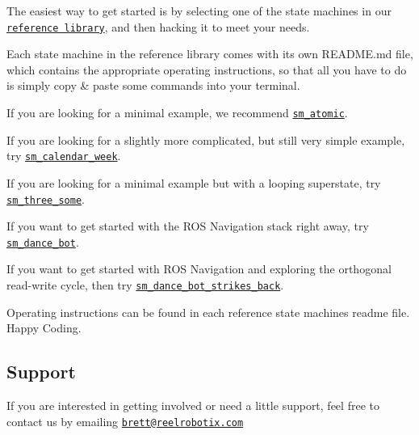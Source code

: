 The easiest way to get started is by selecting one of the state machines in our \href{https://github.com/reelrbtx/SMACC/tree/master/smacc_sm_reference_library}{\tt reference library}, and then hacking it to meet your needs.

Each state machine in the reference library comes with it\textquotesingle{}s own R\+E\+A\+D\+M\+E.\+md file, which contains the appropriate operating instructions, so that all you have to do is simply copy \& paste some commands into your terminal.

If you are looking for a minimal example, we recommend \href{https://github.com/reelrbtx/SMACC/tree/master/smacc_sm_reference_library/sm_atomic}{\tt sm\+\_\+atomic}.

If you are looking for a slightly more complicated, but still very simple example, try \href{https://github.com/reelrbtx/SMACC/tree/master/smacc_sm_reference_library/sm_calendar_week}{\tt sm\+\_\+calendar\+\_\+week}.

If you are looking for a minimal example but with a looping superstate, try \href{https://github.com/reelrbtx/SMACC/tree/master/smacc_sm_reference_library/sm_three_some}{\tt sm\+\_\+three\+\_\+some}.

If you want to get started with the R\+OS Navigation stack right away, try \href{https://github.com/reelrbtx/SMACC/tree/master/smacc_sm_reference_library/sm_dance_bot}{\tt sm\+\_\+dance\+\_\+bot}.

If you want to get started with R\+OS Navigation and exploring the orthogonal read-\/write cycle, then try \href{https://github.com/reelrbtx/SMACC/tree/master/smacc_sm_reference_library/sm_dance_bot_strikes_back}{\tt sm\+\_\+dance\+\_\+bot\+\_\+strikes\+\_\+back}.

Operating instructions can be found in each reference state machines readme file. Happy Coding.

\subsection*{Support}

If you are interested in getting involved or need a little support, feel free to contact us by emailing \href{mailto:brett@reelrobotix.com}{\tt brett@reelrobotix.\+com} 